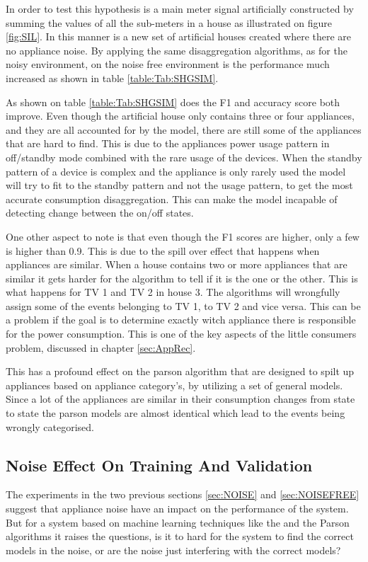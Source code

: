 In order to test this hypothesis is a main meter signal artificially constructed by summing the values of all the sub-meters in a house as illustrated on figure \ref{fig:SIL}. In this manner is a new set of artificial houses created where there are no appliance noise. By applying the same disaggregation algorithms, as for the noisy environment, on the noise free environment is the performance much increased as shown in table \ref{table:Tab:SHGSIM}.

  

As shown on table \ref{table:Tab:SHGSIM} does the F1 and accuracy score both improve. Even though the artificial house only contains three or four appliances, and they are all accounted for by the model, there are still some of the appliances that are hard to find. This is due to the appliances power usage pattern in off/standby mode combined with the rare usage of the devices. When the standby pattern of a device is complex and the appliance is only rarely used the model will try to fit to the standby pattern and not the usage pattern, to get the most accurate consumption disaggregation. This can make the model incapable of detecting change between the on/off states.

One other aspect to note is that even though the F1 scores are higher, only a few is higher than 0.9. This is due to the spill over effect that happens when appliances are similar. When a house contains two or more appliances that are similar it gets harder for the algorithm to tell if it is the one or the other. This is what happens for TV 1 and TV 2 in house 3. The algorithms will wrongfully assign some of the events belonging to TV 1, to TV 2 and vice versa. This can be a problem if the goal is to determine exactly witch appliance there is responsible for the power consumption. This is one of the key aspects of the little consumers problem, discussed in chapter \ref{sec:AppRec}.

This has a profound effect on the parson algorithm that are designed to spilt up appliances based on appliance category's, by utilizing a set of general models. Since a lot of the appliances are similar in their consumption changes from state to state the parson models are almost identical which lead to the events being wrongly categorised. 

\newpage

\subsection{Noise Effect On Training And Validation }
The experiments in the two previous sections \ref{sec:NOISE} and \ref{sec:NOISEFREE} suggest that appliance noise have an impact on the performance of the system. But for a system based on machine learning techniques like the  and the Parson algorithms it raises the questions, is it to hard for the system to find the correct models in the noise, or are the noise just interfering with the correct models? 

